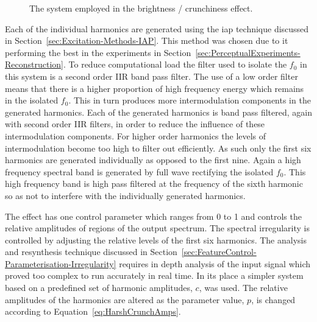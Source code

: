 \begin{figure}[h!]
				\caption{The system employed in the brightness / crunchiness effect.}
				\label{fig:HarshCrunch}
			\end{figure}

			Each of the individual harmonics are generated using the \acrshort{iap} technique discussed in
			Section~\ref{sec:Excitation-Methods-IAP}. This method was chosen due to it performing the best in
			the experiments in Section~\ref{sec:PerceptualExperiments-Reconstruction}. To reduce computational
			load the filter used to isolate the $f_{0}$ in this system is a second order IIR band pass filter.
			The use of a low order filter means that there is a higher proportion of high frequency energy
			which remains in the isolated $f_{0}$. This in turn produces more intermodulation components in the
			generated harmonics. Each of the generated harmonics is band pass filtered, again with second order
			IIR filters, in order to reduce the influence of these intermodulation components. For higher order
			harmonics the levels of intermodulation become too high to filter out efficiently. As such only the
			first six harmonics are generated individually as opposed to the first nine. Again a high frequency
			spectral band is generated by full wave rectifying the isolated $f_{0}$. This high frequency band
			is high pass filtered at the frequency of the sixth harmonic so as not to interfere with the
			individually generated harmonics.

			The effect has one control parameter which ranges from 0 to 1 and controls the relative amplitudes
			of regions of the output spectrum. The spectral irregularity is controlled by adjusting the
			relative levels of the first six harmonics. The analysis and resynthesis technique discussed in
			Section~\ref{sec:FeatureControl-Parameterisation-Irregularity} requires in depth analysis of the
			input signal which proved too complex to run accurately in real time. In its place a simpler system
			based on a predefined set of harmonic amplitudes, $c$, was used. The relative amplitudes of the
			harmonics are altered as the parameter value, $p$, is changed according to
			Equation~\ref{eq:HarshCrunchAmps}.

